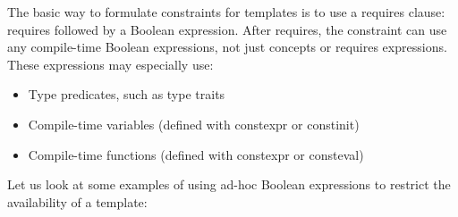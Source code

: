 The basic way to formulate constraints for templates is to use a requires clause: requires followed by a Boolean expression. After requires, the constraint can use any compile-time Boolean expressions, not just concepts or requires expressions. These expressions may especially use:

\begin{itemize}
\item
Type predicates, such as type traits

\item
Compile-time variables (defined with constexpr or constinit)

\item
Compile-time functions (defined with constexpr or consteval)
\end{itemize}

Let us look at some examples of using ad-hoc Boolean expressions to restrict the availability of a template:

